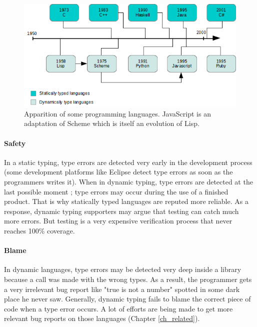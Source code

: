 \documentclass[a4paper]{report}
\newcommand{\refch}[1]{(Chapter \ref{#1})}
\begin{document}
\begin{figure}
\centering
\includegraphics{images/histo.png}
\caption{Apparition of some programming languages. JavaScript is an adaptation of Scheme which is itself an evolution of Lisp.}
\label{histo}
\end{figure}

\paragraph{Safety} In a static typing, type errors are detected very early in the development process (some development platforms like Eclipse detect type errors as soon as the programmers writes it). When in dynamic typing, type errors are detected at the last possible moment ; type errors may occur during the use of a finished product. That is why statically typed languages are reputed more reliable. As a response, dynamic typing supporters may argue that testing can catch much more errors. But testing is a very expensive verification process that never reaches 100\% coverage.  

\paragraph{Blame} In dynamic languages, type errors may be detected very deep inside a library because a call was made with the wrong types. As a result, the programmer gets a very irrelevant bug report like "true is not a number" spotted in some dark place he never saw. Generally, dynamic typing fails to blame the correct piece of code when a type error occurs. A lot of efforts are being made to get more relevant bug reports on those languages \refch{ch_related}.
\end{document}
